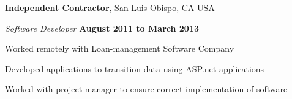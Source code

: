 \documentclass[10pt]{article}
\begin{document}
\halfblankline


{\textbf{Independent Contractor}}, San Luis Obispo, CA USA
\begin{outerlist}
\item[] \textit{Software Developer}%
    \hfill \textbf{August 2011 to March 2013}
    \begin{innerlist}%
    \item Worked remotely with Loan-management Software Company
    \item Developed applications to transition data using ASP.net applications
    \item Worked with project manager to ensure correct implementation of software
\end{innerlist}

\end{outerlist}

\halfblankline
\end{document}
